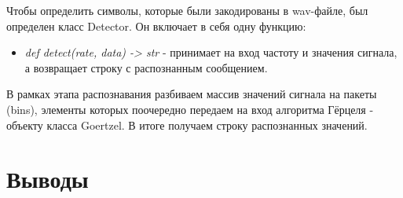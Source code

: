 Чтобы определить символы, которые были закодированы в wav-файле, был определен класс Detector. Он включает в себя одну функцию:

\begin{itemize}
	\item \textit{def detect(rate, data) -> str} - принимает на вход частоту и значения сигнала, а возвращает строку с распознанным сообщением.
\end{itemize}

В рамках этапа распознавания разбиваем массив значений сигнала на пакеты (bins), элементы которых поочередно передаем на вход алгоритма Гёрцеля - объекту класса Goertzel. В итоге получаем строку распознанных значений.

\section{Выводы} \label{ch2:conclusion}


%
\newpage %
